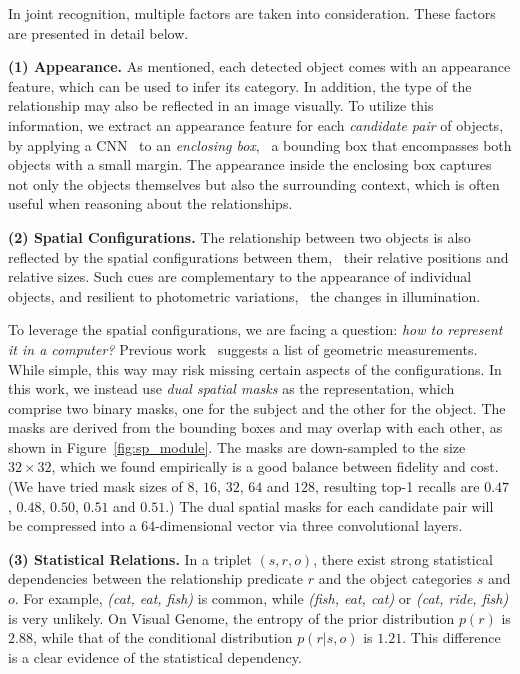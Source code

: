 \documentclass[10pt,twocolumn,letterpaper]{article}
\begin{document}
In joint recognition, multiple factors are taken into consideration.
These factors are presented in detail below.

\textbf{(1) Appearance.}%
As mentioned, each detected object comes with an appearance feature,
which can be used to infer its category. 
In addition, the type of the relationship may also be
reflected in an image visually.
To utilize this information, we extract an appearance feature for each
\emph{candidate pair} of objects, by applying a CNN~\cite{Simonyan14c,he2015deep} 
to an \emph{enclosing box}, 
\ie~a bounding box that encompasses both objects with a small margin.
The appearance inside the enclosing box captures not only the objects themselves
but also the surrounding context, which is often useful when
reasoning about the relationships.

\textbf{(2) Spatial Configurations.}%
The relationship between two objects is also reflected
by the spatial configurations between them, 
\eg~their relative positions and relative sizes.
Such cues are complementary to the appearance of individual objects,
and resilient to photometric variations, \eg~the changes in illumination.

To leverage the spatial configurations, we are facing a question:
{\em how to represent it in a computer?}
Previous work~\cite{johnson2015image} suggests a list of geometric measurements.
While simple, this way may risk missing certain aspects of the configurations.
In this work, we instead use \emph{dual spatial masks} as the representation,
which comprise two binary masks, one for the subject and the other for the object.
The masks are derived from the bounding boxes and may overlap with each other,
as shown in Figure~\ref{fig:sp_module}.
The masks are down-sampled to the size $32 \times 32$, 
which we found empirically is a good balance between fidelity and cost.
(We have tried mask sizes of $8$, $16$, $32$, $64$ and $128$, 
resulting top-1 recalls are $0.47$, $0.48$, $0.50$, $0.51$ and $0.51$.)
The dual spatial masks for each candidate pair will be compressed into
a $64$-dimensional vector via three convolutional layers.

\textbf{(3) Statistical Relations.}%
In a triplet $(s, r, o)$, 
there exist strong statistical dependencies 
between the relationship predicate $r$ and the object categories $s$ and $o$. 
For example, \emph{(cat, eat, fish)} is common, 
while \emph{(fish, eat, cat)} or \emph{(cat, ride, fish)} is very unlikely. 
On Visual Genome, the entropy of the prior distribution $p(r)$ is $2.88$,
while that of the conditional distribution $p(r |s, o)$ is $1.21$.
This difference is a clear evidence of the statistical dependency. 
\end{document}
